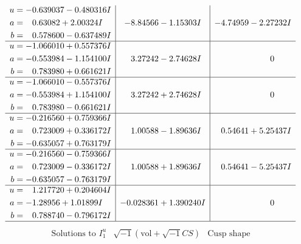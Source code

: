\documentclass[1p]{elsarticle_modified}
\theoremstyle{definition}
\newcommand{\I}{\sqrt{-1}}
\begin{document}
$$\begin{array}{c|c|c}
\begin{aligned}
u &= -0.639037 - 0.480316 I \\
a &= \phantom{-}0.63082 + 2.00324 I \\
b &= \phantom{-}0.578600 - 0.637489 I\end{aligned}
 & -8.84566 - 1.15303 I & -4.74959 - 2.27232 I \\ \hline\begin{aligned}
u &= -1.066010 + 0.557376 I \\
a &= -0.553984 - 1.154100 I \\
b &= \phantom{-}0.783980 + 0.661621 I\end{aligned}
 & \phantom{-}3.27242 - 2.74628 I & \phantom{-0.000000 } 0 \\ \hline\begin{aligned}
u &= -1.066010 - 0.557376 I \\
a &= -0.553984 + 1.154100 I \\
b &= \phantom{-}0.783980 - 0.661621 I\end{aligned}
 & \phantom{-}3.27242 + 2.74628 I & \phantom{-0.000000 } 0 \\ \hline\begin{aligned}
u &= -0.216560 + 0.759366 I \\
a &= \phantom{-}0.723009 + 0.336172 I \\
b &= -0.635057 + 0.763179 I\end{aligned}
 & \phantom{-}1.00588 - 1.89636 I & \phantom{-}0.54641 + 5.25437 I \\ \hline\begin{aligned}
u &= -0.216560 - 0.759366 I \\
a &= \phantom{-}0.723009 - 0.336172 I \\
b &= -0.635057 - 0.763179 I\end{aligned}
 & \phantom{-}1.00588 + 1.89636 I & \phantom{-}0.54641 - 5.25437 I \\ \hline\begin{aligned}
u &= \phantom{-}1.217720 + 0.204604 I \\
a &= -1.28956 + 1.01899 I \\
b &= \phantom{-}0.788740 - 0.796172 I\end{aligned}
 & -0.028361 + 1.390240 I & \phantom{-0.000000 } 0\\
 \hline 
 \end{array}$$\newpage$$\begin{array}{c|c|c}  
\text{Solutions to }I^u_{1}& \I (\text{vol} + \sqrt{-1}CS) & \text{Cusp shape}\\
 \hline 
\begin{aligned}

\end{aligned}
\end{array}$$
\end{document}
